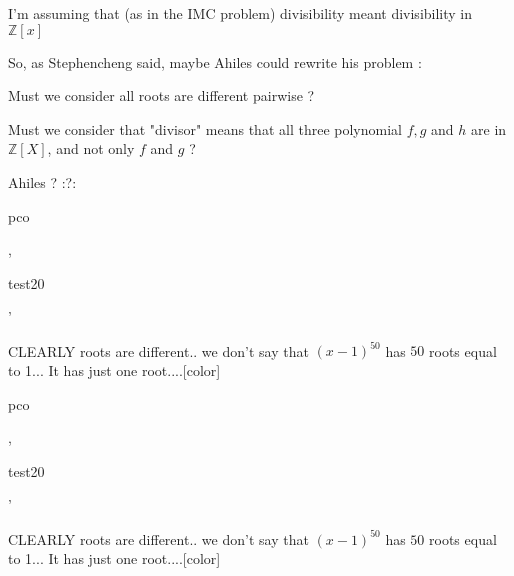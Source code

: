 \begin{solution}
	\begin{tcolorbox} I'm assuming that (as in the IMC problem) divisibility meant divisibility in $ \mathbb{Z}[x]$\end{tcolorbox}

So, as Stephencheng said, maybe Ahiles could rewrite his problem :

Must we consider all roots are different pairwise ?

Must we consider that "divisor" means that all three polynomial $ f,g$ and $ h$ are in $ \mathbb Z[X]$, and not only $ f$ and $ g$ ?

Ahiles ? :?:
\end{solution}



\begin{solution}\begin{bolded}pco\end{bolded}, \begin{bolded}test20\end{bolded}'

CLEARLY roots are different.. we don't say that $ (x - 1)^{50}$ has $ 50$ roots equal to 1... It has just one root....[\/color]
\end{solution}



\begin{solution}
	\begin{tcolorbox}[color=darkblue]\begin{bolded}pco\end{bolded}, \begin{bolded}test20\end{bolded}'

CLEARLY roots are different.. we don't say that $ (x - 1)^{50}$ has $ 50$ roots equal to 1... It has just one root....[\/color]\end{tcolorbox}

 
\end{solution}



